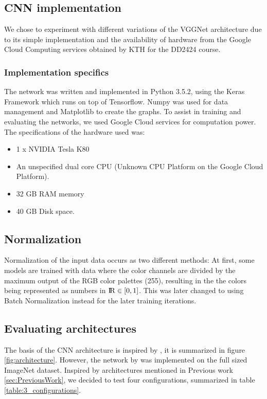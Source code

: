 \documentclass{kthreport}
\begin{document}
\subsection{CNN implementation}

We chose to experiment with different variations of the VGGNet architecture due to its simple implementation and the availability of hardware from the Google Cloud Computing services obtained by KTH for the DD2424 course.

\subsubsection{Implementation specifics}

The network was written and implemented in Python 3.5.2, using the Keras Framework which runs on top of Tensorflow. Numpy was used for data management and Matplotlib to create the graphs. To assist in training and evaluating the networks, we used Google Cloud services for computation power. The specifications of the hardware used was:

\begin{itemize}
  \item 1 x NVIDIA Tesla K80
  \item An unspecified dual core CPU (Unknown CPU Platform on the Google Cloud Platform).
  \item 32 GB RAM memory
  \item 40 GB Disk space.
\end{itemize}

\subsection{Normalization}
Normalization of the input data occurs as two different methods: At first, some models are trained with data where the color channels are divided by the maximum output of the RGB color palettes (255), resulting in the the colors being represented as numbers in ${\rm I\!R} \in [0,1]$.
This was later changed to using Batch Normalization instead for the later training iterations.

\subsection{Evaluating architectures}

The basis of the CNN architecture is inspired by \cite{NIPS2012_4824}, it is summarized in figure \ref{fig:architecture}. However, the network by \cite{NIPS2012_4824} was implemented on the full sized ImageNet dataset. Inspired by architectures mentioned in Previous work \ref{sec:PreviousWork}, we decided to test four configurations, summarized in table \ref{table:3_configurations}.
\end{document}
